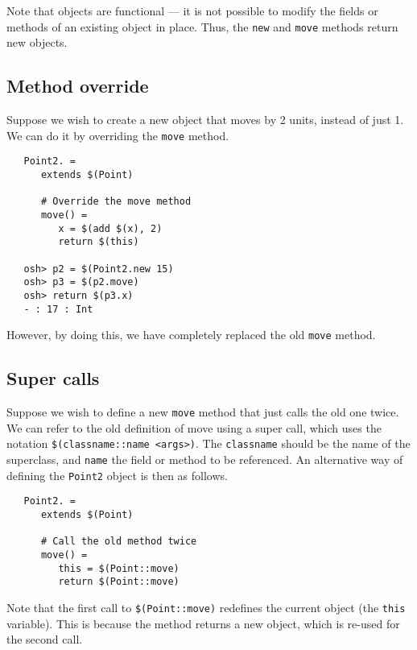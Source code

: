 Note that objects are functional --- it is not possible to modify the fields
or methods of an existing object in place.  Thus, the \verb+new+ and \verb+move+
methods return new objects.

\subsection{Method override}

Suppose we wish to create a new object that moves by 2 units, instead of
just 1.  We can do it by overriding the \verb+move+ method.

\begin{verbatim}
   Point2. =
      extends $(Point)

      # Override the move method
      move() =
         x = $(add $(x), 2)
         return $(this)

   osh> p2 = $(Point2.new 15)
   osh> p3 = $(p2.move)
   osh> return $(p3.x)
   - : 17 : Int
\end{verbatim}

However, by doing this, we have completely replaced the old \verb+move+ method.

\subsection{Super calls}

Suppose we wish to define a new \verb+move+ method that just calls the old one twice.
We can refer to the old definition of move using a super call, which uses the notation
\verb+$(classname::name <args>)+.  The \verb+classname+ should be the name of the
superclass, and \verb+name+ the field or method to be referenced.  An alternative
way of defining the \verb+Point2+ object is then as follows.

\begin{verbatim}
   Point2. =
      extends $(Point)

      # Call the old method twice
      move() =
         this = $(Point::move)
         return $(Point::move)
\end{verbatim}

Note that the first call to \verb+$(Point::move)+ redefines the
current object (the \verb+this+ variable).  This is because the method
returns a new object, which is re-used for the second call.

